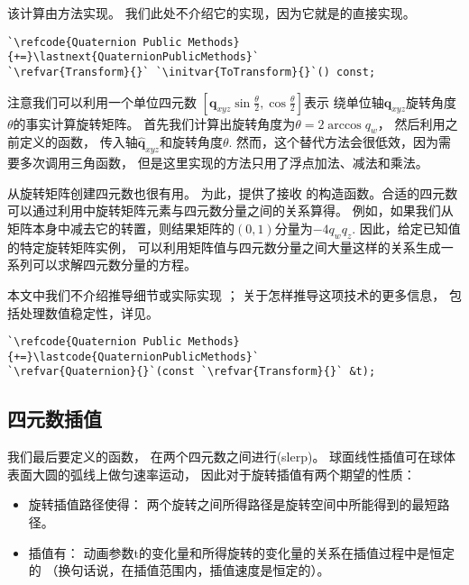 该计算由方法实现。
我们此处不介绍它的实现，因为它就是的直接实现。
\begin{lstlisting}
`\refcode{Quaternion Public Methods}{+=}\lastnext{QuaternionPublicMethods}`
`\refvar{Transform}{}` `\initvar{ToTransform}{}`() const;
\end{lstlisting}

注意我们可以利用一个单位四元数
$\displaystyle[\bm q_{xyz}\sin\frac{\theta}{2},\cos\frac{\theta}{2}]$表示
绕单位轴$\hat{\bm q}_{xyz}$旋转角度$\theta$的事实计算旋转矩阵。
首先我们计算出旋转角度为$\theta=2\arccos q_w$，
然后利用之前定义的函数，
传入轴$\hat{\bm q}_{xyz}$和旋转角度$\theta$.
然而，这个替代方法会很低效，因为需要多次调用三角函数，
但是这里实现的方法只用了浮点加法、减法和乘法。

从旋转矩阵创建四元数也很有用。
为此，提供了接收
的构造函数。合适的四元数可以通过利用中旋转矩阵元素与四元数分量之间的关系算得。
例如，如果我们从矩阵本身中减去它的转置，则结果矩阵的$(0,1)$分量为$-4q_wq_z$.
因此，给定已知值的特定旋转矩阵实例，
可以利用矩阵值与四元数分量之间大量这样的关系生成一系列可以求解四元数分量的方程。

本文中我们不介绍推导细节或实际实现
；
关于怎样推导这项技术的更多信息，
包括处理数值稳定性，详见\citet{SHOEMAKE1991351}。

\begin{lstlisting}
`\refcode{Quaternion Public Methods}{+=}\lastcode{QuaternionPublicMethods}`
`\refvar{Quaternion}{}`(const `\refvar{Transform}{}` &t);
\end{lstlisting}

\subsection{四元数插值}\label{sub:四元数插值}
我们最后要定义的函数，
在两个四元数之间进行(slerp)。
球面线性插值可在球体表面大圆的弧线上做匀速率运动，
因此对于旋转插值有两个期望的性质：
\begin{itemize}
    \item 旋转插值路径使得：
          两个旋转之间所得路径是旋转空间中所能得到的最短路径。
    \item 插值有：
          动画参数{\ttfamily t}的变化量和所得旋转的变化量的关系在插值过程中是恒定的
          （换句话说，在插值范围内，插值速度是恒定的）。
\end{itemize}

